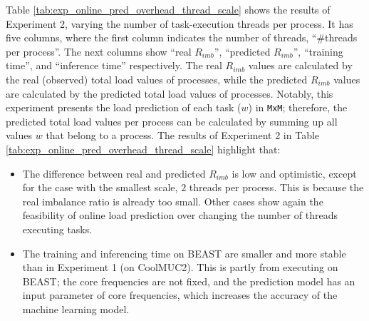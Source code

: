 \begin{table}[t]
\centering
\caption{Evaluation of online load prediction for \texttt{MxM} over the scale of threads per process.}
\label{tab:exp_online_pred_overhead_thread_scale}
\end{table}

Table \ref{tab:exp_online_pred_overhead_thread_scale} shows the results of Experiment 2, varying the number of task-execution threads per process. It has five columns, where the first column indicates the number of threads, ``\#threads per process''. The next columns show ``real $R_{imb}$'', ``predicted $R_{imb}$'', ``training time'', and ``inference time'' respectively. The real $R_{imb}$ values are calculated by the real (observed) total load values of processes, while the predicted $R_{imb}$ values are calculated by the predicted total load values of processes. Notably, this experiment presents the load prediction of each task ($w$) in \texttt{MxM}; therefore, the predicted total load values per process can be calculated by summing up all values $w$ that belong to a process. The results of Experiment 2 in Table \ref{tab:exp_online_pred_overhead_thread_scale} highlight that:

\begin{itemize}
	\item The difference between real and predicted $R_{imb}$ is low and optimistic, except for the case with the smallest scale, $2$ threads per process. This is because the real imbalance ratio is already too small. Other cases show again the feasibility of online load prediction over changing the number of threads executing tasks.
	\item The training and inferencing time on BEAST are smaller and more stable than in Experiment 1 (on CoolMUC2). This is partly from executing on BEAST; the core frequencies are not fixed, and the prediction model has an input parameter of core frequencies, which increases the accuracy of the machine learning model.
\end{itemize}

